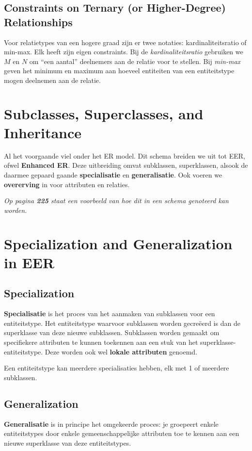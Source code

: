 \subsection{Constraints on Ternary (or Higher-Degree) Relationships}
Voor relatietypes van een hogere graad zijn er twee notaties: kardinaliteitsratio of min-max. Elk heeft zijn eigen constraints. Bij de \textit{kardinaliteitsratio} gebruiken we $M$ en $N$ om ``een aantal'' deelnemers aan de relatie voor te stellen. Bij \textit{min-max} geven het minimum en maximum aan hoeveel entiteiten van een entiteitstype mogen deelnemen aan de relatie.


\section{Subclasses, Superclasses, and Inheritance}
Al het voorgaande viel onder het ER model. Dit schema breiden we uit tot EER, ofwel \textbf{Enhanced ER}. Deze uitbreiding omvat subklassen, superklassen, alsook de daarmee gepaard gaande \textbf{specialisatie} en \textbf{generalisatie}. Ook voeren we \textbf{overerving} in voor attributen en relaties.

\textit{Op pagina \textbf{225} staat een voorbeeld van hoe dit in een schema genoteerd kan worden.}


\section{Specialization and Generalization in EER}
\subsection{Specialization}
\textbf{Specialisatie} is het proces van het aanmaken van subklassen voor een entiteitstype. Het entiteitstype waarvoor subklassen worden gecre\"eerd is dan de superklasse van deze nieuwe subklassen. Subklassen worden gemaakt om specifiekere attributen te kunnen toekennen aan een stuk van het superklasse-entiteitstype. Deze worden ook wel \textbf{lokale attributen} genoemd.

Een entiteitstype kan meerdere specialisaties hebben, elk met 1 of meerdere subklassen.

\subsection{Generalization}
\textbf{Generalisatie} is in principe het omgekeerde proces: je groepeert enkele entiteitstypes door enkele gemeenschappelijke attributen toe te kennen aan een nieuwe superklasse van deze entiteitstypes.


